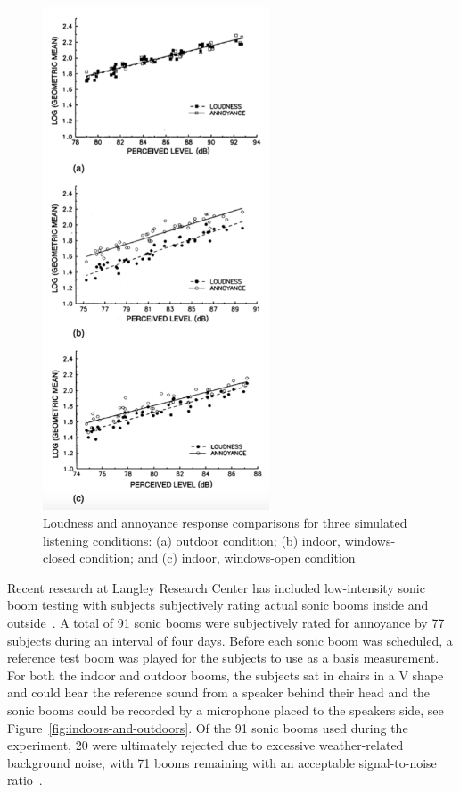 \documentclass[]{aiaa-tc}%
\begin{document}
\begin{figure}[tb!]
  \centering
  \includegraphics[width=0.6\textwidth]{figs/simulated-comparisons.png}
  \caption{Loudness and annoyance response comparisons for three simulated listening conditions: (a) outdoor condition; (b) indoor, windows-closed condition; and (c) indoor, windows-open condition~\cite{leatherwood2002summary}}
  \label{fig:simulated-comparisons}
\end{figure}

Recent research at Langley Research Center has included low-intensity sonic boom testing with subjects subjectively rating actual sonic booms inside and outside~\cite{sullivan2010human}. A total of 91 sonic booms were subjectively rated for annoyance by 77 subjects during an interval of four days. Before each sonic boom was scheduled, a reference test boom was played for the subjects to use as a basis measurement. For both the indoor and outdoor booms, the subjects sat in chairs in a V shape and could hear the reference sound from a speaker behind their head and the sonic booms could be recorded by a microphone placed to the speakers side, see Figure~\ref{fig:indoors-and-outdoors}. Of the 91 sonic booms used during the experiment, 20 were ultimately rejected due to excessive weather-related background noise, with 71 booms remaining with an acceptable signal-to-noise ratio~\cite{sullivan2010human}.
\end{document}
